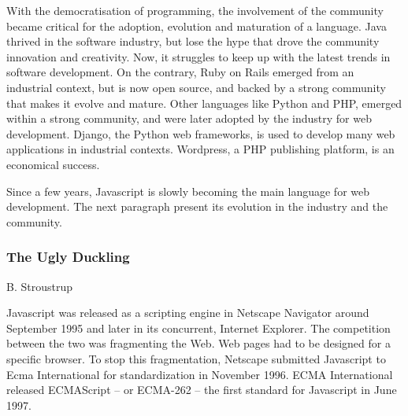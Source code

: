 With the democratisation of programming, the involvement of the community became critical for the adoption, evolution and maturation of a language.
Java thrived in the software industry, but lose the hype that drove the community innovation and creativity.
Now, it struggles to keep up with the latest trends in software development.
On the contrary, Ruby on Rails emerged from an industrial context, but is now open source, and backed by a strong community that makes it evolve and mature.
Other languages like Python and PHP, emerged within a strong community, and were later adopted by the industry for web development.
Django, the Python web frameworks, is used to develop many web applications in industrial contexts.
Wordpress, a PHP publishing platform, is an economical success.

Since a few years, Javascript is slowly becoming the main language for web development.
The next paragraph present its evolution in the industry and the community.

\subsubsection{The Ugly Duckling}

%
{B. Stroustrup}


Javascript was released as a scripting engine in Netscape Navigator around September 1995 and later in its concurrent, Internet Explorer.
The competition between the two was fragmenting the Web.
Web pages had to be designed for a specific browser.
To stop this fragmentation, Netscape submitted Javascript to Ecma International for standardization in November 1996.
ECMA International released  ECMAScript -- or ECMA-262 -- the first standard for Javascript in June 1997. %

\paragraph{}

